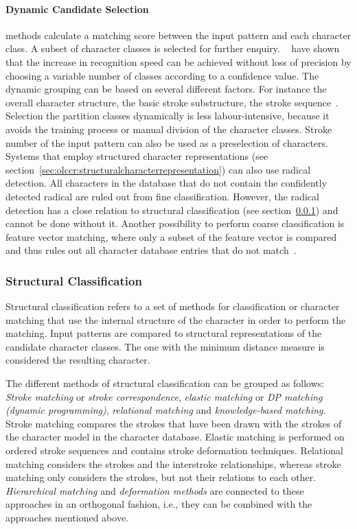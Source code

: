 \paragraph{Dynamic Candidate Selection} methods calculate a matching score between 
the input pattern and each character class. A subset of character classes is 
selected for further enquiry.
~\citeyear{LiuNakagawa2000} have shown that the 
increase in recognition speed can be achieved without loss of precision by 
choosing a variable number of classes according to a confidence value.
The dynamic grouping can be based on several different factors. For instance
the overall character structure, the basic stroke substructure, the stroke 
sequence~.
Selection the partition classes dynamically is less labour-intensive, because it
avoids the training process or manual division of the character classes.
Stroke number of the input pattern can also be used as a preselection of
characters. Systems that employ structured character representations (see 
section~\ref{sec:olccr:structuralcharacterrepresentation}) can also use radical 
detection. All characters in the database that do not contain the confidently 
detected radical are ruled out from fine classification. However, the radical
detection has a close relation to structural classification (see 
section~\ref{sec:olccr:structuralclassification}) and cannot be done without it.
Another possibility to perform coarse classification is feature vector matching,
where only a subset of the feature vector is compared and thus rules out all
character database entries that do not match~.

\subsubsection{Structural Classification}
\label{sec:olccr:structuralclassification}

Structural classification refers to a set of methods for classification or
character matching that use the internal structure of the character in order to
perform the matching. Input patterns are compared to structural representations
of the candidate character classes.
The one with the minimum distance measure is considered the resulting character.

The different methods of structural classification can be grouped as follows:\\
\emph{Stroke matching} or \emph{stroke correspondence}, 
\emph{elastic matching} or \emph{DP matching (dynamic programming)}, 
\emph{relational matching} and \emph{knowledge-based matching}.
Stroke matching compares the strokes that have been drawn with the strokes of the
character model in the character database. Elastic matching is performed on 
ordered stroke sequences and contains stroke deformation techniques. 
Relational matching considers the strokes and the interstroke relationships, 
whereas stroke matching only considers the strokes, but not their relations 
to each other. \emph{Hierarchical matching} and \emph{deformation methods} are 
connected to these approaches in an orthogonal fashion, i.e., they can be combined
with the approaches mentioned above.

